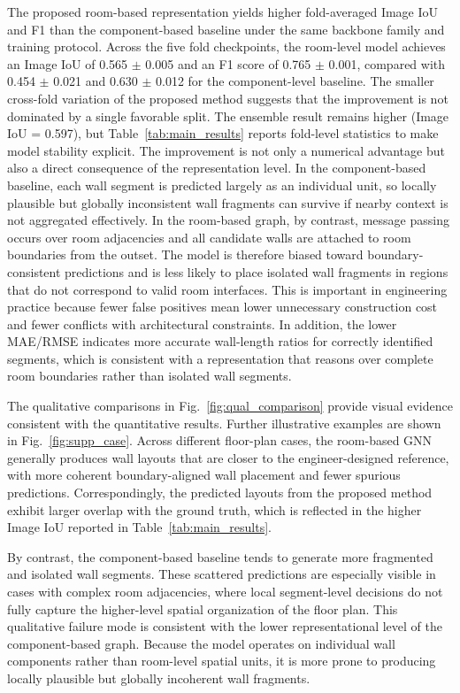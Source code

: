 The proposed room-based representation yields higher fold-averaged Image IoU and F1 than the component-based baseline under the same backbone family and training protocol. Across the five fold checkpoints, the room-level model achieves an Image IoU of 0.565 $\pm$ 0.005 and an F1 score of 0.765 $\pm$ 0.001, compared with 0.454 $\pm$ 0.021 and 0.630 $\pm$ 0.012 for the component-level baseline. The smaller cross-fold variation of the proposed method suggests that the improvement is not dominated by a single favorable split. The ensemble result remains higher (Image IoU = 0.597), but Table~\ref{tab:main_results} reports fold-level statistics to make model stability explicit. The improvement is not only a numerical advantage but also a direct consequence of the representation level. In the component-based baseline, each wall segment is predicted largely as an individual unit, so locally plausible but globally inconsistent wall fragments can survive if nearby context is not aggregated effectively. In the room-based graph, by contrast, message passing occurs over room adjacencies and all candidate walls are attached to room boundaries from the outset. The model is therefore biased toward boundary-consistent predictions and is less likely to place isolated wall fragments in regions that do not correspond to valid room interfaces. This is important in engineering practice because fewer false positives mean lower unnecessary construction cost and fewer conflicts with architectural constraints. In addition, the lower MAE/RMSE indicates more accurate wall-length ratios for correctly identified segments, which is consistent with a representation that reasons over complete room boundaries rather than isolated wall segments.

The qualitative comparisons in Fig.~\ref{fig:qual_comparison} provide visual evidence consistent with the quantitative results. Further illustrative examples are shown in Fig.~\ref{fig:supp_case}. Across different floor-plan cases, the room-based GNN generally produces wall layouts that are closer to the engineer-designed reference, with more coherent boundary-aligned wall placement and fewer spurious predictions. Correspondingly, the predicted layouts from the proposed method exhibit larger overlap with the ground truth, which is reflected in the higher Image IoU reported in Table~\ref{tab:main_results}.

By contrast, the component-based baseline tends to generate more fragmented and isolated wall segments. These scattered predictions are especially visible in cases with complex room adjacencies, where local segment-level decisions do not fully capture the higher-level spatial organization of the floor plan. This qualitative failure mode is consistent with the lower representational level of the component-based graph. Because the model operates on individual wall components rather than room-level spatial units, it is more prone to producing locally plausible but globally incoherent wall fragments.


